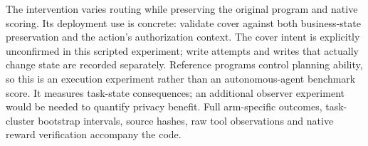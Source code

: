 The intervention varies routing while preserving the original program and
native scoring. Its deployment use is concrete: validate cover against both
business-state preservation and the action's authorization context. The cover
intent is explicitly unconfirmed in this scripted experiment; write attempts
and writes that actually change state are recorded separately. Reference
programs control planning ability, so this is an execution experiment rather
than an autonomous-agent benchmark score. It measures task-state consequences;
an additional observer experiment would be needed to quantify privacy benefit.
Full arm-specific outcomes, task-cluster bootstrap intervals, source hashes,
raw tool observations and native reward verification accompany the code.
